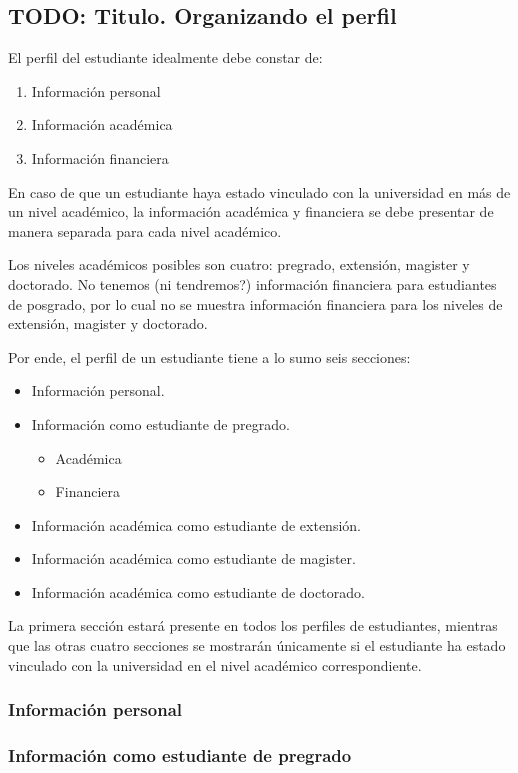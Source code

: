 \subsection{TODO: Titulo. Organizando el perfil}

El perfil del estudiante idealmente debe constar de:
\begin{enumerate}
  \item Información personal
  \item Información académica
  \item Información financiera
\end{enumerate}
En caso de que un estudiante haya estado vinculado con la universidad en más de un nivel académico, la información académica y financiera se debe presentar de manera separada para cada nivel académico.

Los niveles académicos posibles son cuatro: pregrado, extensión, magister y doctorado. No tenemos (ni tendremos?) información financiera para estudiantes de posgrado, por lo cual no se muestra información financiera para los niveles de extensión, magister y doctorado.

Por ende, el perfil de un estudiante tiene a lo sumo seis secciones:
\begin{itemize}
  \item Información personal.
  \item Información como estudiante de pregrado.
  \begin{itemize}
    \item Académica
    \item Financiera
  \end{itemize}
  \item Información académica como estudiante de extensión.
  \item Información académica como estudiante de magister.
  \item Información académica como estudiante de doctorado.
\end{itemize}
La primera sección estará presente en todos los perfiles de estudiantes, mientras que las otras cuatro secciones se mostrarán únicamente si el estudiante ha estado vinculado con la universidad en el nivel académico correspondiente.

\subsubsection{Información personal}


\subsubsection{Información como estudiante de pregrado}

